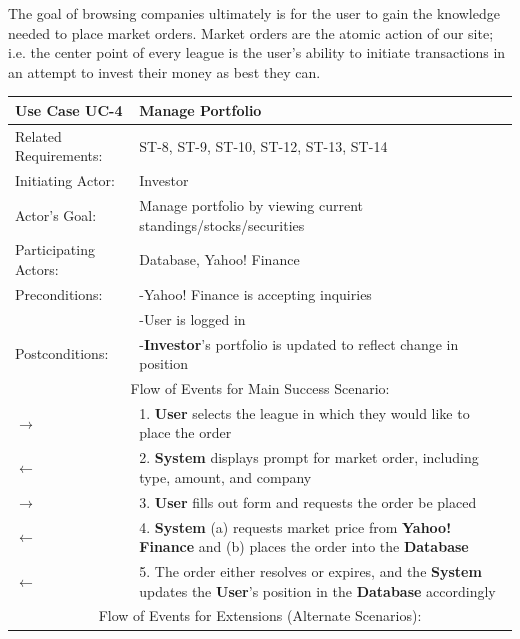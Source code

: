 The goal of browsing companies ultimately is for the user to gain the knowledge needed to
place market orders. Market orders are the atomic action of our site; i.e. the center
point of every league is the user's ability to initiate transactions in an attempt to
invest their money as best they can. \\

\begin{centering}
\label{UC-4}
\renewcommand\arraystretch{1.3}
\begin{longtable}{|p{1.2in} p{5in}|}
\hline
\bfseries{\color{color1}Use Case UC-4} &
\bfseries{\color{color1}Manage Portfolio} \\
\hline
Related Requirements: & ST-8, ST-9, ST-10, ST-12, ST-13, ST-14 \\
Initiating Actor:     & Investor \\
Actor's Goal:         & Manage portfolio by viewing current standings/stocks/securities \\
Participating Actors: & Database, Yahoo! Finance \\
Preconditions:        & -Yahoo! Finance is accepting inquiries \\
                      & -User is logged in \\
Postconditions:       & -\textbf{Investor}'s portfolio is updated to reflect change
                        in position \\
\hline
\multicolumn{2}{|c|}{\color{color1}Flow of Events for Main Success Scenario:}\\
\hline
$\rightarrow$ & 1. \textbf{User} selects the league in which they would like to place the order \\
$\leftarrow$ & 2. \textbf{System} displays prompt for market order, including type, amount, and company \\
$\rightarrow$ & 3. \textbf{User} fills out form and requests the order be placed \\
$\leftarrow$ & 4. \textbf{System} (a) requests market price from \textbf{Yahoo! Finance} and (b) places the order into the \textbf{Database} \\
$\leftarrow$ & 5. The order either resolves or expires, and the \textbf{System} updates the \textbf{User}'s position in the \textbf{Database} accordingly \\
\hline
\multicolumn{2}{|c|}{\color{color1}Flow of Events for Extensions (Alternate Scenarios):} \\
\hline


\end{longtable}
\end{centering}
